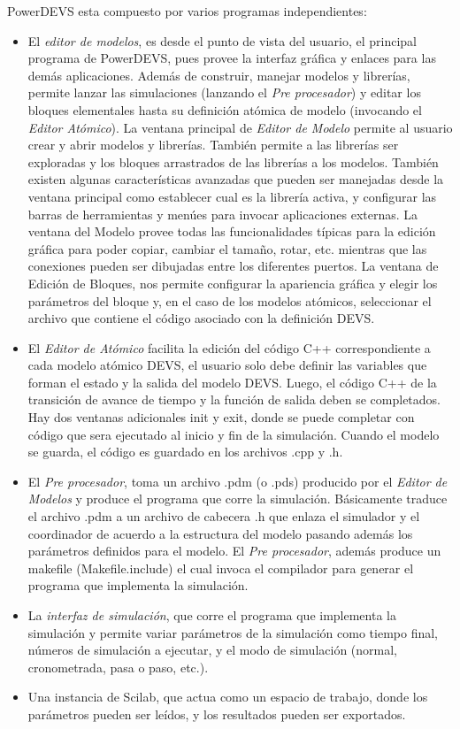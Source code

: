 \documentclass[a4paper,	11pt]{report}
\begin{document}
PowerDEVS esta compuesto por varios programas independientes:
\begin{itemize}
\item El \emph{editor de modelos}, es desde el punto de vista del usuario, el principal programa de PowerDEVS, pues provee la interfaz gráfica y enlaces para las demás aplicaciones. 
Además de construir, manejar modelos y librerías, permite lanzar las simulaciones (lanzando el \emph{Pre procesador}) y editar los bloques elementales hasta su definición atómica de modelo (invocando el \emph{Editor Atómico}).
La ventana principal de \emph{Editor de Modelo} permite al usuario crear y abrir modelos y librerías. También permite a las librerías ser exploradas y los bloques arrastrados de las librerías a los modelos.
También existen algunas características avanzadas que pueden ser manejadas desde la ventana principal como establecer cual es la librería activa, y configurar las barras de herramientas y menúes para invocar aplicaciones externas.
La ventana del Modelo provee todas las funcionalidades típicas para la edición gráfica para poder copiar, cambiar el tamaño, rotar, etc. mientras que las conexiones pueden ser dibujadas entre los diferentes puertos.
La ventana de Edición de Bloques, nos permite configurar la apariencia gráfica y elegir los parámetros del bloque y, en el caso de los modelos atómicos, seleccionar el archivo que contiene el código asociado con la definición DEVS.

\item El \emph{Editor de Atómico} facilita la edición del código C++ correspondiente a cada modelo atómico DEVS, el usuario solo debe definir las variables que forman el estado y la salida del modelo DEVS. Luego, el código C++ de la transición de avance de tiempo y la función de salida deben se completados. Hay dos ventanas adicionales init y exit, donde se puede completar con código que sera ejecutado al inicio y fin de la simulación.
Cuando el modelo se guarda, el código es guardado en los archivos .cpp y .h. 

\item El \emph{Pre procesador}, toma un archivo .pdm (o .pds) producido por el \emph{Editor de Modelos} y produce el programa que corre la simulación. Básicamente traduce el archivo .pdm a un archivo de cabecera .h que enlaza el simulador y el coordinador de acuerdo a la estructura del modelo pasando además los parámetros definidos para el modelo.
El \emph{Pre procesador}, además produce un makefile (Makefile.include) el cual invoca el compilador para generar el programa que implementa la simulación. 

\item La \emph{interfaz de simulación}, que corre el programa que implementa la simulación y permite variar parámetros de la simulación como tiempo final, números de simulación a ejecutar, y el modo de simulación (normal, cronometrada, pasa o paso, etc.).

\item Una instancia de Scilab, que actua como un espacio de trabajo, donde los parámetros pueden ser leídos, y los resultados pueden ser exportados. 
\end{itemize}
\end{document}
